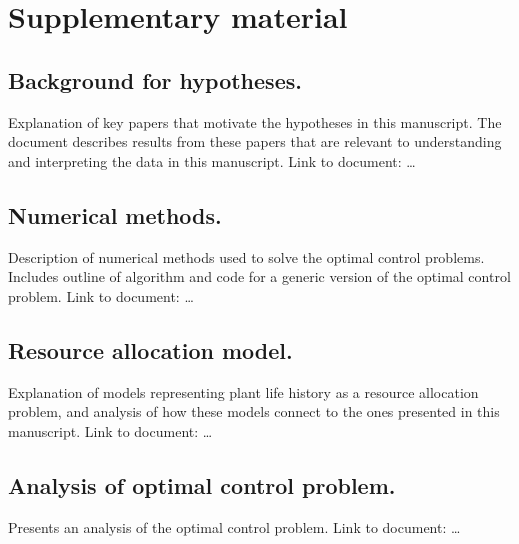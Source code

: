 \documentclass[12pt, oneside]{article}   	%
\begin{document}
\clearpage
\section*{Supplementary material}

\subsection*{Background for hypotheses.} Explanation of key papers that motivate the hypotheses in this manuscript. The document describes results from these papers that are relevant to understanding and interpreting the data in this manuscript. Link to document: \dots

\subsection*{Numerical methods.} Description of numerical methods used to solve the optimal control problems. Includes outline of algorithm and code for a generic version of the optimal control problem. Link to document: \dots

\subsection*{Resource allocation model.} Explanation of models representing plant life history as a resource allocation problem, and analysis of how these models connect to the ones presented in this manuscript. Link to document: \dots

\subsection*{Analysis of optimal control problem.} Presents an analysis of the optimal control problem. Link to document: \dots
\end{document}
